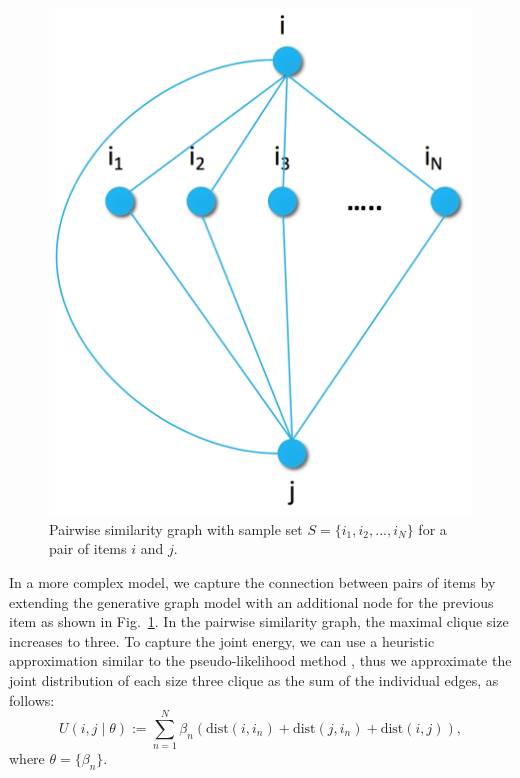 \begin{figure}
\centerline{
  \includegraphics[scale=.2]{i2i_joined.png}}

\caption[]{Pairwise similarity graph with sample set $S=\{i_1,i_2,...,i_{N}\}$ for a pair of items $i$ and $j$.}
\label{fig:join}
\end{figure}


In a more complex model, we capture the connection between pairs of items by extending the generative graph model with an additional node for the previous item as shown in Fig.~\ref{fig:join}.  In the pairwise similarity graph, the maximal clique size increases to three. To capture the joint energy, we can use a heuristic approximation similar to the pseudo-likelihood method \cite{besag1975statistical}, thus we approximate the joint distribution of each size three clique as the sum of the individual edges, as follows:
%
\begin{equation}
\label{eq:potential_joined}
U(i,j \mid \theta) := \sum_{n=1}^{N} \beta_{n} (\mbox{dist}(i,i_n) + \mbox{dist}(j,i_n) + \mbox{dist}(i,j)),
\end{equation}
%
where $\theta = \{\beta_n\}$.

